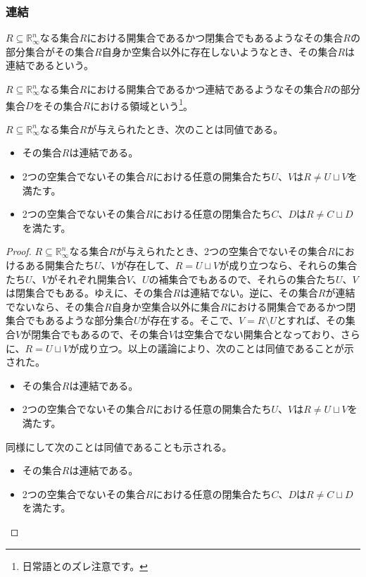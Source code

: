 \documentclass[dvipdfmx]{jsarticle}
\begin{document}
\subsubsection{連結}%
\begin{dfn}
$R \subseteq \mathbb{R}_{\infty}^{n}$なる集合$R$における開集合であるかつ閉集合でもあるようなその集合$R$の部分集合がその集合$R$自身か空集合以外に存在しないようなとき、その集合$R$は連結であるという。
\end{dfn}
\begin{dfn}
$R \subseteq \mathbb{R}_{\infty}^{n}$なる集合$R$における開集合であるかつ連結であるようなその集合$R$の部分集合$D$をその集合$R$における領域という\footnote{日常語とのズレ注意です。}。
\end{dfn}
\begin{thm}\label{4.1.12.4}
$R \subseteq \mathbb{R}_{\infty}^{n}$なる集合$R$が与えられたとき、次のことは同値である。
\begin{itemize}
\item
  その集合$R$は連結である。
\item
  2つの空集合でないその集合$R$における任意の開集合たち$U$、$V$は$R \neq U \sqcup V$を満たす。
\item
  2つの空集合でないその集合$R$における任意の閉集合たち$C$、$D$は$R \neq C \sqcup D$を満たす。
\end{itemize}
\end{thm}
\begin{proof}
$R \subseteq \mathbb{R}_{\infty}^{n}$なる集合$R$が与えられたとき、2つの空集合でないその集合$R$におけるある開集合たち$U$、$V$が存在して、$R = U \sqcup V$が成り立つなら、それらの集合たち$U$、$V$がそれぞれ開集合$V$、$U$の補集合でもあるので、それらの集合たち$U$、$V$は閉集合でもある。ゆえに、その集合$R$は連結でない。逆に、その集合$R$が連結でないなら、その集合$R$自身か空集合以外に集合$R$における開集合であるかつ閉集合でもあるような部分集合$U$が存在する。そこで、$V = R \setminus U$とすれば、その集合$V$が閉集合でもあるので、その集合$V$は空集合でない開集合となっており、さらに、$R = U \sqcup V$が成り立つ。以上の議論により、次のことは同値であることが示された。
\begin{itemize}
\item
  その集合$R$は連結である。
\item
  2つの空集合でないその集合$R$における任意の開集合たち$U$、$V$は$R \neq U \sqcup V$を満たす。
\end{itemize}
同様にして次のことは同値であることも示される。
\begin{itemize}
\item
  その集合$R$は連結である。
\item
  2つの空集合でないその集合$R$における任意の閉集合たち$C$、$D$は$R \neq C \sqcup D$を満たす。
\end{itemize}
\end{proof}
\end{document}
